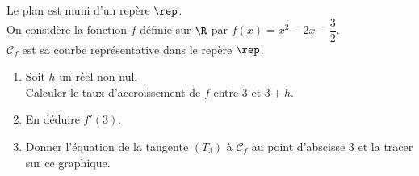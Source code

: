 \documentclass[a4paper,11pt,exos]{nsi}
\begin{document}
\begin{minipage}{10.5cm}
    \exo{}
	Le plan est muni d'un repère $\rep$.\\
	On considère la fonction $f$ définie sur $\R$ par $f(x)=x^2-2x-\dfrac{3}{2}$.\\
	
	$\mathcal{C}_f$ est sa courbe représentative dans le repère $\rep$.
	\begin{enumerate}[]
		\item 	Soit $h$ un réel non nul.\\
        Calculer le taux d'accroissement de $f$ entre $3$ et $3+h$.
		\item En déduire $f'(3)$.
		\item 	Donner l'équation de la tangente $(T_3)$ à $\mathcal{C}_f$ au point d'abscisse 3 et la tracer sur ce graphique.\\
	\end{enumerate}
\end{minipage}
\begin{minipage}{6.5cm}
	\begin{center}
	\end{center}
\end{minipage}
\end{document}
